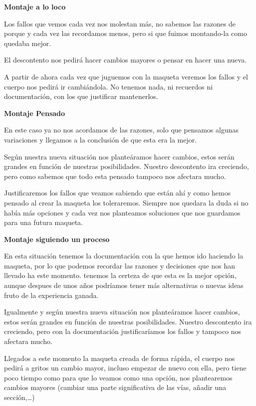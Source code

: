 \begin{multicols}{3}
	\textbf{Montaje a lo loco}
	
	Los fallos que vemos cada vez nos molestan más, no sabemos las razones de porque y cada vez las recordamos menos, pero si que fuimos montando-la como quedaba mejor.
	
	El descontento nos pedirá hacer cambios mayores o pensar en hacer una nueva.
	
	A partir de ahora cada vez que juguemos con la maqueta veremos los fallos y el cuerpo nos pedirá ir cambiándola. No tenemos nada, ni recuerdos ni documentación, con los que justificar mantenerlos.
	
	\columnbreak
	
	\textbf{Montaje Pensado}
	
	En este caso ya no nos acordamos de las razones, solo que pensamos algunas variaciones y llegamos a la conclusión de que esta era la mejor. 

	Según nuestra nueva situación nos planteáramos hacer cambios, estos serán grandes en función de nuestras posibilidades. Nuestro descontento ira creciendo, pero como sabemos que todo esta pensado tampoco nos afectara mucho.
	
	Justificaremos los fallos que veamos sabiendo que están ahí y como hemos pensado al crear la maqueta los toleraremos. Siempre nos quedara la duda si no había más opciones y cada vez nos planteamos soluciones que nos guardamos para una futura maqueta.
	
	\columnbreak
	
	\textbf{Montaje siguiendo un proceso}
	
	En esta situación tenemos la documentación con la que hemos ido haciendo la maqueta, por lo que podemos recordar las razones y decisiones que nos han llevado ha este momento. tenemos la certeza de que esta es la mejor opción, aunque despues de unos años podríamos tener más alternativas o nuevas ideas fruto de la experiencia ganada.
	
	Igualmente y según nuestra nueva situación nos planteáramos hacer cambios, estos serán grandes en función de nuestras posibilidades. Nuestro descontento ira creciendo, pero con la documentación justificaríamos los fallos y tampoco nos afectara mucho.
	
	
\end{multicols}
Llegados a este momento la maqueta creada de forma rápida, el cuerpo nos pedirá a gritos un cambio mayor, incluso empezar de nuevo con ella, pero tiene poco tiempo como para que lo veamos como una opción, nos plantearemos cambios mayores (cambiar una parte significativa de las vías, añadir una sección,\dots)

